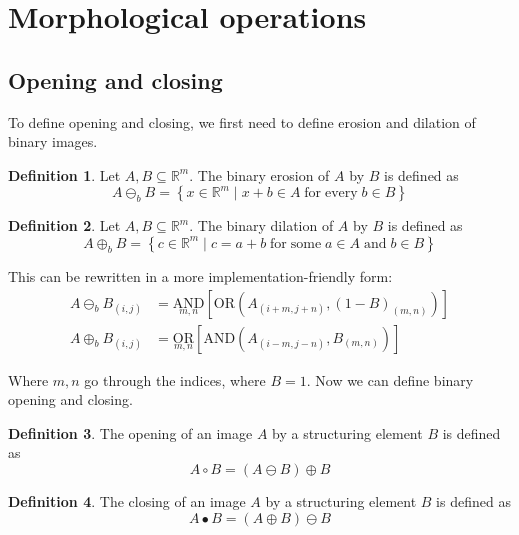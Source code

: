 \documentclass[a4paper,12pt]{article}
\theoremstyle{plain}
\theoremstyle{definition}
\newtheorem{definition}{Definition}
\theoremstyle{remark}
\begin{document}
\newpage

\section{Morphological operations}

\subsection{Opening and closing}

To define opening and closing, we first need to define erosion and dilation of binary images.

\begin{definition}
	Let $A, B \subseteq \mathbb{R}^m$. The binary erosion of $A$ by $B$ is defined as
	\begin{equation*}
		A \ominus_b B = \left\{ x \in \mathbb{R}^m \mid x + b \in A \; \mathrm{for \; every} \; b \in B \right\}
	\end{equation*}
\end{definition}
\begin{definition}
	Let $A, B \subseteq \mathbb{R}^m$. The binary dilation of $A$ by $B$ is defined as
	\begin{equation*}
		A \oplus_b B = \left\{ c \in \mathbb{R}^m \mid c = a + b \; \mathrm{for \; some} \; a \in A \; \mathrm{and} \; b \in B \right\}
	\end{equation*}
\end{definition}

This can be rewritten in a more implementation-friendly form:
\begin{align*}
	A \ominus_b B_{(i, j)} &= \underset{m, n}{\mathrm{AND}} [ \mathrm{OR} (A_{(i + m, j + n)}, (1 - B)_{(m, n)}) ] \\
	A \oplus_b B_{(i, j)} &= \underset{m, n}{\mathrm{OR}} [ \mathrm{AND} (A_{(i - m, j - n)}, B_{(m, n)}) ]
\end{align*}

Where $m, n$ go through the indices, where $B = 1$. Now we can define binary opening and closing.

\begin{definition}
	The opening of an image $A$ by a structuring element $B$ is defined as
	\begin{equation*}
		A \circ B = (A \ominus B) \oplus B
	\end{equation*}
\end{definition}
\begin{definition}
	The closing of an image $A$ by a structuring element $B$ is defined as
	\begin{equation*}
		A \bullet B = (A \oplus B) \ominus B
	\end{equation*}
\end{definition}
\end{document}

